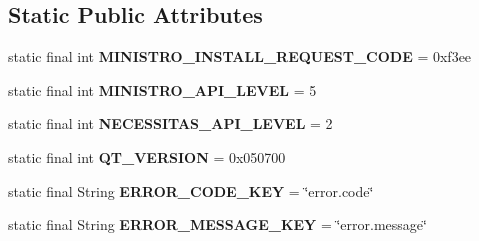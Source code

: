 \subsection*{Static Public Attributes}
\begin{DoxyCompactItemize}
\item 
\mbox{\label{classorg_1_1qtproject_1_1qt5_1_1android_1_1bindings_1_1_qt_loader_a038d5241d0aa3cd77d27cf5fe9546f61}} 
static final int {\bfseries M\+I\+N\+I\+S\+T\+R\+O\+\_\+\+I\+N\+S\+T\+A\+L\+L\+\_\+\+R\+E\+Q\+U\+E\+S\+T\+\_\+\+C\+O\+DE} = 0xf3ee
\item 
\mbox{\label{classorg_1_1qtproject_1_1qt5_1_1android_1_1bindings_1_1_qt_loader_ab27fd6ba23d9da63a85f489d2dde7dcd}} 
static final int {\bfseries M\+I\+N\+I\+S\+T\+R\+O\+\_\+\+A\+P\+I\+\_\+\+L\+E\+V\+EL} = 5
\item 
\mbox{\label{classorg_1_1qtproject_1_1qt5_1_1android_1_1bindings_1_1_qt_loader_af21597b2e209d6b4fb3c8e051a49959d}} 
static final int {\bfseries N\+E\+C\+E\+S\+S\+I\+T\+A\+S\+\_\+\+A\+P\+I\+\_\+\+L\+E\+V\+EL} = 2
\item 
\mbox{\label{classorg_1_1qtproject_1_1qt5_1_1android_1_1bindings_1_1_qt_loader_a1ae72ed858b9b170e368541ad29f4af7}} 
static final int {\bfseries Q\+T\+\_\+\+V\+E\+R\+S\+I\+ON} = 0x050700
\item 
\mbox{\label{classorg_1_1qtproject_1_1qt5_1_1android_1_1bindings_1_1_qt_loader_ae16f83f4abcf6b2c9d40bec6e056e3e9}} 
static final String {\bfseries E\+R\+R\+O\+R\+\_\+\+C\+O\+D\+E\+\_\+\+K\+EY} = \char`\"{}error.\+code\char`\"{}
\item 
\mbox{\label{classorg_1_1qtproject_1_1qt5_1_1android_1_1bindings_1_1_qt_loader_aad949a40a949bccb63d9a0d9a1145696}} 
static final String {\bfseries E\+R\+R\+O\+R\+\_\+\+M\+E\+S\+S\+A\+G\+E\+\_\+\+K\+EY} = \char`\"{}error.\+message\char`\"{}
\item 
\mbox{\label{classorg_1_1qtproject_1_1qt5_1_1android_1_1bindings_1_1_qt_loader_ac61f42836ded2a0ed1fa1fca92bea06f}} 

\end{DoxyCompactItemize}

